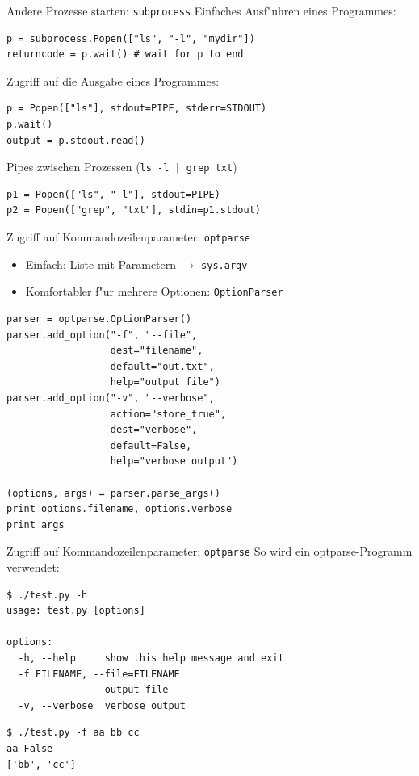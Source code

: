 \begin{frame}[fragile]{Andere Prozesse starten: \texttt{subprocess}}
Einfaches Ausf"uhren eines Programmes:
\begin{lstlisting}[style=Python]
p = subprocess.Popen(["ls", "-l", "mydir"])
returncode = p.wait() # wait for p to end
\end{lstlisting}
Zugriff auf die Ausgabe eines Programmes:
\begin{lstlisting}[style=Python]
p = Popen(["ls"], stdout=PIPE, stderr=STDOUT) 
p.wait()
output = p.stdout.read()
\end{lstlisting}
Pipes zwischen Prozessen (\lstinline{ls -l | grep txt})
\begin{lstlisting}[style=Python]
p1 = Popen(["ls", "-l"], stdout=PIPE)
p2 = Popen(["grep", "txt"], stdin=p1.stdout)
\end{lstlisting}
\end{frame}

\begin{frame}[fragile]{Zugriff auf Kommandozeilenparameter: \texttt{optparse}}
\begin{itemize}
\item Einfach: Liste mit Parametern $\rightarrow$ \texttt{sys.argv}
\item Komfortabler f"ur mehrere Optionen: \texttt{OptionParser}
\end{itemize}
\begin{lstlisting}[style=Python]
parser = optparse.OptionParser()
parser.add_option("-f", "--file", 
                  dest="filename",
                  default="out.txt",
                  help="output file")
parser.add_option("-v", "--verbose",
                  action="store_true", 
                  dest="verbose", 
                  default=False,
                  help="verbose output")

(options, args) = parser.parse_args()
print options.filename, options.verbose
print args
\end{lstlisting}
\end{frame}
\begin{frame}[fragile]{Zugriff auf Kommandozeilenparameter: \texttt{optparse}}
So wird ein optparse-Programm verwendet:
\begin{lstlisting}[style=Shell]
$ ./test.py -h
usage: test.py [options]

options:
  -h, --help     show this help message and exit
  -f FILENAME, --file=FILENAME
                 output file
  -v, --verbose  verbose output
\end{lstlisting} %
\begin{lstlisting}[style=Shell]
$ ./test.py -f aa bb cc
aa False
['bb', 'cc']
\end{lstlisting} %
\end{frame}

